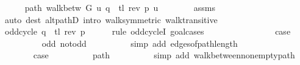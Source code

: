 \begin{isabellebody}
\ \ \ \ \isamarkupfalse%
\ path{\isacharcolon}{\kern0pt}\ {\isachardoublequoteopen}walk{\isacharunderscore}{\kern0pt}betw\ G\ u\ {\isacharparenleft}{\kern0pt}q\ {\isacharat}{\kern0pt}\ tl\ {\isacharparenleft}{\kern0pt}rev\ p{\isacharparenright}{\kern0pt}{\isacharparenright}{\kern0pt}\ u{\isachardoublequoteclose}\isanewline
\ \ \ \ \ \ \isamarkupfalse%
\ assms{\isacharparenleft}{\kern0pt}{}{\isacharcomma}{\kern0pt}\ {}{\isacharparenright}{\kern0pt}\isanewline
\ \ \ \ \ \ \isamarkupfalse%
\ {\isacharparenleft}{\kern0pt}auto\ dest{\isacharcolon}{\kern0pt}\ alt{\isacharunderscore}{\kern0pt}pathD{\isacharparenleft}{\kern0pt}{}{\isacharparenright}{\kern0pt}\ intro{\isacharcolon}{\kern0pt}\ walk{\isacharunderscore}{\kern0pt}symmetric\ walk{\isacharunderscore}{\kern0pt}transitive{\isacharparenright}{\kern0pt}\isanewline
\ \ \ \ \isamarkupfalse%
\ \isamarkupfalse%
\ {\isachardoublequoteopen}odd{\isacharunderscore}{\kern0pt}cycle\ {\isacharparenleft}{\kern0pt}q\ {\isacharat}{\kern0pt}\ tl\ {\isacharparenleft}{\kern0pt}rev\ p{\isacharparenright}{\kern0pt}{\isacharparenright}{\kern0pt}{\isachardoublequoteclose}\isanewline
\ \ \ \ \isamarkupfalse%
\ {\isacharparenleft}{\kern0pt}rule\ odd{\isacharunderscore}{\kern0pt}cycleI{\isacharcomma}{\kern0pt}\ goal{\isacharunderscore}{\kern0pt}cases{\isacharparenright}{\kern0pt}\isanewline
\ \ \ \ \ \ \isamarkupfalse%
\ {}\isanewline
\ \ \ \ \ \ \isamarkupfalse%
\ {\isacharquery}{\kern0pt}case\isanewline
\ \ \ \ \ \ \ \ \isamarkupfalse%
\ odd\ not{\isacharunderscore}{\kern0pt}odd\isanewline
\ \ \ \ \ \ \ \ \isamarkupfalse%
\ {\isacharparenleft}{\kern0pt}simp\ add{\isacharcolon}{\kern0pt}\ edges{\isacharunderscore}{\kern0pt}of{\isacharunderscore}{\kern0pt}path{\isacharunderscore}{\kern0pt}length{\isacharparenright}{\kern0pt}\isanewline
\ \ \ \ \isamarkupfalse%
\isanewline
\ \ \ \ \ \ \isamarkupfalse%
\ {}\isanewline
\ \ \ \ \ \ \isamarkupfalse%
\ {\isacharquery}{\kern0pt}case\isanewline
\ \ \ \ \ \ \ \ \isamarkupfalse%
\ path\isanewline
\ \ \ \ \ \ \ \ \isamarkupfalse%
\ {\isacharparenleft}{\kern0pt}simp\ add{\isacharcolon}{\kern0pt}\ walk{\isacharunderscore}{\kern0pt}between{\isacharunderscore}{\kern0pt}nonempty{\isacharunderscore}{\kern0pt}path{\isacharparenleft}{\kern0pt}{}{\isacharcomma}{\kern0pt}\ {}{\isacharparenright}{\kern0pt}{\isacharparenright}{\kern0pt}\isanewline

\end{isabellebody}
